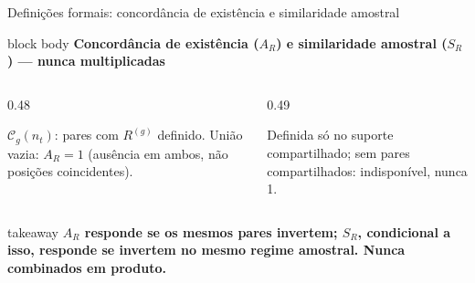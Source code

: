 \begin{frame}{Definições formais: concordância de existência e similaridade amostral}
  \vspace{.15cm}
  \begin{beamercolorbox}[wd=\linewidth,sep=.14cm,rounded=true]{block body}
    {\bfseries\color{CoInfoBlue}Concordância de existência ($A_R$) e similaridade amostral ($S_R$) --- nunca multiplicadas}\par\vspace{.08cm}
    \begin{columns}[T,onlytextwidth]
      \begin{column}{0.48\textwidth}
        \vspace{.10cm}

        {\fontsize{9.0}{10.7}\selectfont $\mathcal C_g(n_t)$: pares com $R^{(g)}$ definido. União vazia: $A_R=1$ (ausência em ambos, não posições coincidentes).}
      \end{column}
      \begin{column}{0.49\textwidth}
        \vspace{.10cm}

        \vspace{.08cm}

        {\fontsize{9.0}{10.7}\selectfont Definida só no suporte compartilhado; sem pares compartilhados: indisponível, nunca 1.}
      \end{column}
    \end{columns}
  \end{beamercolorbox}

  \vspace{.12cm}
  \begin{beamercolorbox}[wd=\linewidth,sep=.10cm,rounded=true]{takeaway}
    \centering\bfseries\fontsize{9.8}{11.6}\selectfont
    $A_R$ responde se os mesmos pares invertem; $S_R$, condicional a isso, responde se invertem no mesmo regime amostral. Nunca combinados em produto.
  \end{beamercolorbox}

\end{frame}

